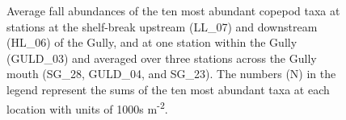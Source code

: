 \documentclass[12pt]{article}\usepackage[]{graphicx}\usepackage[]{color}
\begin{document}
\begin{figure}[htb]

{\centering {} 

}

\caption{Average fall abundances of the ten most abundant copepod taxa at stations at the shelf-break upstream (LL\_07) and downstream (HL\_06) of the Gully, and at one station within the Gully (GULD\_03) and averaged over three stations across the Gully mouth (SG\_28, GULD\_04, and SG\_23). The numbers (N) in the legend represent the sums of the ten most abundant taxa at each location with units of 1000s m\textsuperscript{-2}.}\label{fig:figure32}
\end{figure}
\clearpage
\end{document}
